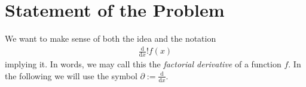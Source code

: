 \documentclass[english, parskip=full]{scrartcl}
\title{\titel}
\author{\autor}
\date{\today}
\newcommand{\tecxt}{}
\begin{document}
\maketitle  %



\section{Statement of the Problem}
We want to make sense of both the idea and the notation
\begin{align}
\frac{\tecxt\text{d}}{\tecxt\text{d}x}! f(x)
\end{align}
implying it.
In words, we may call this the \emph{factorial derivative} of a function $f$.
In the following we will use the symbol $\partial := \frac{\tecxt\text{d}}{\tecxt\text{d}x}$.
\end{document}
